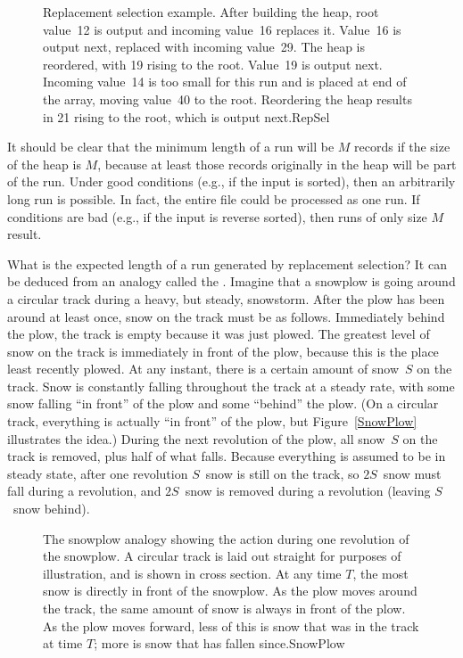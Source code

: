 \begin{figure}
\smallskip
{}
{Replacement selection example.
After building the heap, root value~12
is output and incoming value~16 replaces it.
Value~16 is output next, replaced with incoming value~29.
The heap is reordered, with 19 rising to the root.
Value~19 is output next.
Incoming value~14 is too small for this run and is placed at end
of the array, moving value~40 to the root.
Reordering the heap results in 21 rising to the root, which
is output next.}{RepSel}
\end{figure}

It should be clear that the minimum length of a run will be \(M\)
records if the size of the heap is \(M\), because at least those
records originally in the heap will be part of the run.
Under good conditions (e.g., if the input is sorted), then an
arbitrarily long run is possible.
In fact, the entire file could be processed as one run.
If conditions are bad (e.g., if the input is reverse sorted),
then runs of only size \(M\) result.

What is the expected length of a run generated by replacement
selection?
It can be deduced from an analogy called the
.
Imagine that a snowplow is going around a circular track during a
heavy, but steady, snowstorm.
After the plow has been around at least once, snow on 
the track must be as follows.
Immediately behind the plow, the track is empty because it was just
plowed.
The greatest level of snow on the track is immediately in front of the
plow, because this is the place least recently plowed.
At any instant, there is a certain amount of snow~\(S\) on the
track.
Snow is constantly falling throughout the track at a steady rate,
with some snow falling ``in front'' of the plow and some ``behind''
the plow.
(On a circular track, everything is actually ``in front'' of
the plow, but Figure~\ref{SnowPlow} illustrates the idea.)
During the next revolution of the plow, all snow~\(S\) on the track is
removed, plus half of what falls.
Because everything is assumed to be in steady state, after one
revolution \(S\)~snow is still on the track, so \(2S\)~snow must fall
during a revolution, and \(2S\)~snow is removed during a revolution
(leaving \(S\)~snow behind).

\begin{figure}
\vspace{1pt}

{The snowplow analogy showing the action during one
revolution of the snowplow.
A circular track is laid out straight for purposes of illustration,
and is shown in cross section.
At any time \(T\), the most snow is directly in front of the snowplow.
As the plow moves around the track, the same amount of snow is always
in front of the plow.
As the plow moves forward, less of this is snow that was in
the track at time \(T\); more is snow that has fallen since.}{SnowPlow}
\bigskip
\medskip
\end{figure}

